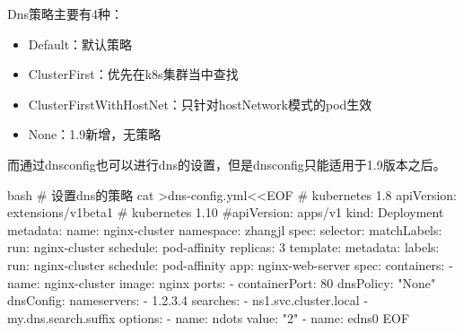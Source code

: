 Dns策略主要有4种：
\begin{itemize}
    \item Default：默认策略
    \item ClusterFirst：优先在k8s集群当中查找
    \item ClusterFirstWithHostNet：只针对hostNetwork模式的pod生效
    \item None：1.9新增，无策略
\end{itemize}

而通过dnsconfig也可以进行dns的设置，但是dnsconfig只能适用于1.9版本之后。
\begin{code-block}{bash}
# 设置dns的策略
cat >dns-config.yml<<EOF
# kubernetes 1.8
apiVersion: extensions/v1beta1
# kubernetes 1.10
#apiVersion: apps/v1
kind: Deployment
metadata:
  name: nginx-cluster
  namespace: zhangjl
spec:
  selector:
    matchLabels:
      run: nginx-cluster
      schedule: pod-affinity
  replicas: 3
  template:
    metadata:
      labels:
        run: nginx-cluster
        schedule: pod-affinity
        app: nginx-web-server
    spec:
      containers:
      - name: nginx-cluster
        image: nginx
        ports:
        - containerPort: 80
      dnsPolicy: "None"
      dnsConfig:
        nameservers:
          - 1.2.3.4
        searches:
          - ns1.svc.cluster.local
          - my.dns.search.suffix
        options:
          - name: ndots
            value: "2"
          - name: edns0
EOF
\end{code-block}